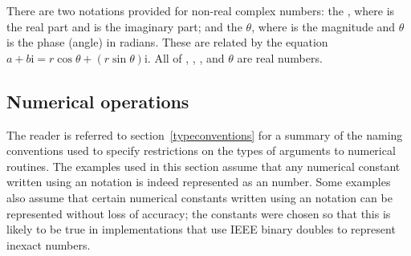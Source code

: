 There are two notations provided for non-real complex numbers:
the 
,
where  is the real part and  is the imaginary part;
and the 
$\theta$,
where  is the magnitude and $\theta$ is the phase (angle) in radians.
These are related by the equation
$a+b\mathrm{i} = r \cos\theta + (r \sin\theta) \mathrm{i}$.
All of , , , and $\theta$ are real numbers.


\subsection{Numerical operations}

The reader is referred to section~\ref{typeconventions} for a summary
of the naming conventions used to specify restrictions on the types of
arguments to numerical routines.
The examples used in this section assume that any numerical constant written
using an  notation is indeed represented as an 
number.  Some examples also assume that certain numerical constants written
using an  notation can be represented without loss of
accuracy; the  constants were chosen so that this is
likely to be true in implementations that use IEEE binary doubles to represent
inexact numbers.

